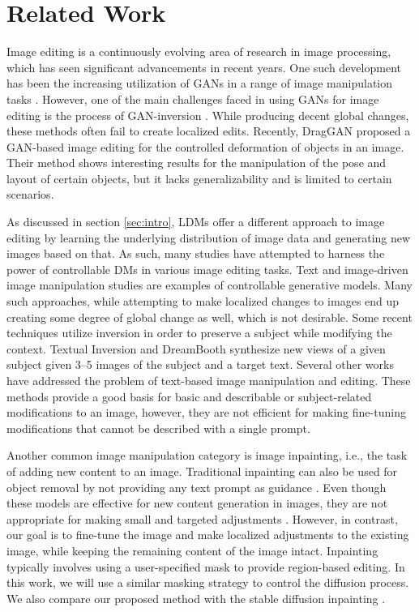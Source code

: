 \documentclass[10pt,twocolumn,letterpaper]{article}
\begin{document}
\section{Related Work}

Image editing is a continuously evolving area of research in image processing, which has seen significant advancements in recent years. One such development has been the increasing utilization of GANs in a range of image manipulation tasks \cite{abdal2021styleflow, lang2021explaining, pan2023drag}. However, one of the main challenges faced in using GANs for image editing is the process of GAN-inversion \cite{richardson2021encoding}. While producing decent global changes, these methods often fail to create localized edits\cite{bar2022text2live}. Recently, DragGAN \cite{pan2023drag} proposed a GAN-based image editing for the controlled deformation of objects in an image. Their method shows interesting results for the manipulation of the pose and layout of certain objects, but it lacks generalizability and is limited to certain scenarios.

As discussed in section \ref{sec:intro}, LDMs offer a different approach to image editing by learning the underlying distribution of image data and generating new images based on that. As such, many studies have attempted to harness the power of controllable DMs in various image editing tasks. Text and image-driven image manipulation studies are examples of controllable generative models\cite{kim2022diffusionclip,hu2022global}.
Many such approaches, while attempting to make localized changes to images end up creating some degree of global change as well, which is not desirable. Some recent techniques utilize inversion \cite{choi2021ilvr} in order to preserve a subject while modifying the context. Textual Inversion \cite{gal2022image} and DreamBooth \cite{ruiz2023dreambooth} synthesize new views of a given subject given 3–5 images of the subject and a target text.
Several other works \cite{bar2022text2live, brooks2022instructpix2pix, kawar2023imagic, couairon2022diffedit, hertz2022prompt} have addressed the problem of text-based image manipulation and editing.
These methods provide a good basis for basic and describable or subject-related modifications to an image, however, they are not efficient for making fine-tuning modifications that cannot be described with a single prompt. 

Another common image manipulation category is image inpainting, i.e., the task of adding new content to an image. Traditional inpainting can also be used for object removal by not providing any text prompt as guidance \cite{avrahami2022blended}. Even though these models are effective for new content generation in images, they are not appropriate for making small and targeted adjustments \cite{avrahami2022blended, lugmayr2022repaint, saharia2022palette}. However, in contrast, our goal is to fine-tune the image and make localized adjustments to the existing image, while keeping the remaining content of the image intact. Inpainting typically involves using a user-specified mask to provide region-based editing. In this work, we will use a similar masking strategy to control the diffusion process. We also compare our proposed method with the stable diffusion inpainting \cite{rombach2022high}.
\end{document}
